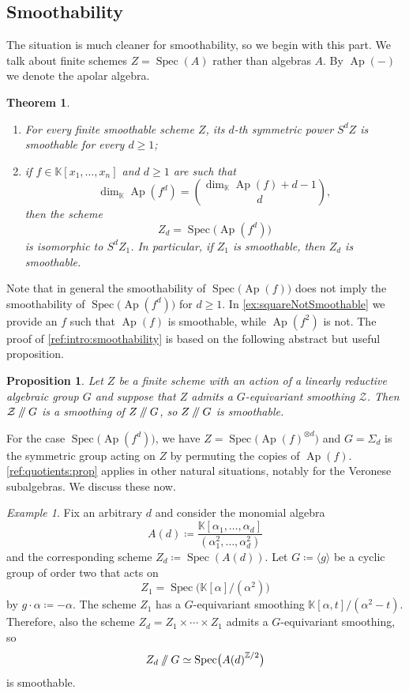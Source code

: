 \documentclass[a4paper,11pt,reqno]{amsart}
\newcommand{\bbK}{\mathbb{K}}
\DeclareMathOperator{\Ap}{Ap}
\DeclareMathOperator{\Spec}{Spec}
\numberwithin{equation}{section}
\theoremstyle{definition}
\theoremstyle{plain}
\newtheorem{teo}[defn]{Theorem}
\newtheorem{prop}[defn]{Proposition}
\theoremstyle{remark}
\newtheorem{exam}[defn]{Example}
\newcommand{\goodquotient}{\mathbin{
  \mathchoice{\left/\mkern-6mu\right/}%
    {/\mkern-5mu/}%
    {/\mkern-5mu/}%
    {/\mkern-5mu/}}}%
\begin{document}
\subsection{Smoothability}\label{ssec:smoothability}

    The situation is much cleaner for smoothability, so we begin with {this part}.
    We talk about finite schemes $Z = \Spec(A)$ rather than algebras $A$.
    By
    $\Ap(-)$ we denote the apolar algebra.

\begin{teo}\label{ref:intro:smoothability}
    \begin{enumerate}[label=(\arabic*), left= 3pt, widest=2,nosep]
        \item For every {finite} smoothable scheme $Z$, its $d$-th symmetric power $S^d Z$ is smoothable for every {$d\geq 1$};
        \item if $f\in \bbK[x_1, \ldots ,x_n]$ and $d\geq 1$ are such that \[
        \dim_{\bbK}
            \Ap(f^d) = \binom{\dim_{\bbK} \Ap(f)+d-1}{d},
            \]
            then the scheme \[Z_d = \Spec \bigl(\Ap(f^d)\bigr)\] is isomorphic to $S^dZ_1$. {In particular,} if $Z_1$ is smoothable, then $Z_d$ is smoothable.
    \end{enumerate}
\end{teo}
{Note} that in general the smoothability of $\Spec \bigl(\Ap(f)\bigr)$ does not imply the
smoothability of $\Spec \bigl(\Ap(f^d)\bigr)$ for $d\geq 1$. In
\autoref{ex:squareNotSmoothable} we provide an $f$ such that $\Ap(f)$ is
smoothable, while $\Ap(f^2)$ is not.
The proof of \autoref{ref:intro:smoothability} is based on the following
abstract but useful proposition.
\begin{prop}\label{ref:quotients:prop}
    Let $Z$ be a finite scheme with an action of a linearly reductive algebraic group $G$ and
    suppose that $Z$ admits a $G$-equivariant smoothing $\mathcal{Z}$. Then
    $\mathcal{Z}\goodquotient G$ is a smoothing of $Z\goodquotient G$, so
    $Z\goodquotient G$ is smoothable.
\end{prop}
For the case $\Spec \bigl(\Ap(f^d)\bigr)$, we have $Z = \Spec \bigl(\Ap(f)^{\otimes d}\bigr)$ and $G =
\Sigma_d$
is the symmetric group acting on $Z$ by permuting the copies of $\Ap(f)$.
\autoref{ref:quotients:prop} applies in other natural situations, notably for
the Veronese subalgebras. We discuss {these} now.
\begin{exam}
    Fix an arbitrary $d$ and consider the monomial algebra
    \[
        {A(d)} \coloneqq \frac{\bbK[\alpha_1, \ldots ,\alpha_{d}]}{(\alpha_1^2,  \ldots
            ,\alpha_{d}^2)}
    \]
    and the corresponding scheme $Z_d \coloneqq \Spec({A(d)})$.
    Let $G \coloneqq \langle g\rangle$ be a cyclic group of order two that acts on
    \[Z_1 = \Spec\bigl(\bbK[\alpha]/(\alpha^2)\bigr)\] by $g\cdot \alpha \coloneqq -\alpha$.
    The
    scheme $Z_1$ has a $G$-equivariant smoothing $\bbK[\alpha, t]/(\alpha^2 -
    t)$. Therefore, also the scheme $Z_d = Z_1\times \cdots \times Z_1$ admits
    a $G$-equivariant smoothing, so
    \[
        Z_d\goodquotient G  \simeq \Spec\bigl( {A(d)}^{\mathbb{Z}/2} \bigr)
    \]
    is smoothable.
\end{exam}
\end{document}
